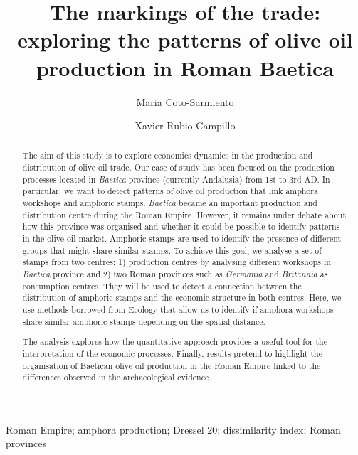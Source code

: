 \documentclass[review]{elsarticle}
\begin{document}
\begin{frontmatter}

\title{The markings of the trade: exploring the patterns of olive oil production in Roman Baetica}

\author[ceipacadress]{Maria Coto-Sarmiento}


\author[edadress]{Xavier Rubio-Campillo}

\address[ceipacadress]{CEIPAC, Department of Prehistory and Archaeology, Montalegre, 6-8, 08001, University of Barcelona, Barcelona, Spain}
\address[edadress]{School of History, Classic \& Archaeology, Room OOM.33, William Robertson Wing, Old Medical School, Teviot Place, University of Edinburgh, UK}

\begin{keyword}
Roman Empire; amphora production; Dressel 20; dissimilarity index; Roman provinces
\end{keyword}


\begin{abstract}

The aim of this study is to explore economics dynamics in the production and distribution of olive oil trade. 
Our case of study has been focused on the production processes located in \textit{Baetica} province (currently Andalusia) from 1st to 3rd AD. In particular, we want to detect patterns of olive oil production that link amphora workshops and amphoric stamps. \textit{Baetica} became an important production and distribution centre during the Roman Empire. However, it remains under debate about how this province was organised and whether it could be possible to identify patterns in the olive oil market. Amphoric stamps are used to identify the presence of different groups that might share similar stamps. To achieve this goal, we analyse a set of stamps from two centres: 1) production centres by analysing different workshops in \textit{Baetica} province and 2) two Roman provinces such as \textit{Germania} and \textit{Britannia} as consumption centres. They will be used to detect a connection between the distribution of amphoric stamps and the economic structure in both centres. Here, we use methods borrowed from Ecology that allow us to identify if amphora workshops share similar amphoric stamps depending on the spatial distance. 

The analysis explores how the quantitative approach provides a useful tool for the interpretation of the economic processes. Finally, results pretend to highlight the organisation of Baetican olive oil production in the Roman Empire linked to the differences observed in the archaeological evidence.

\end{abstract}


\end{frontmatter}
\end{document}
